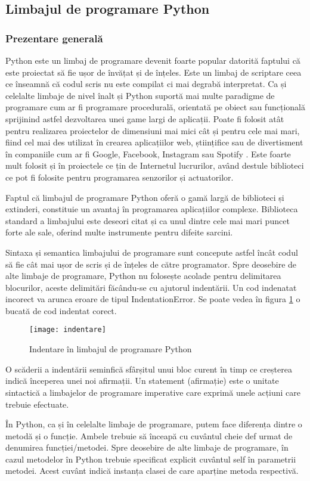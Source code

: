 \documentclass[../IoMusT.tex]{subfiles}
\begin{document}
\subsection{Limbajul de programare Python}
\subsubsection{Prezentare generală}
Python este un limbaj de programare devenit foarte popular datorită faptului că este proiectat să fie ușor de învățat și de înțeles. Este un limbaj de scriptare ceea ce înseamnă că codul scris nu este compilat ci mai degrabă interpretat. Ca și celelalte limbaje de nivel înalt și Python suportă mai multe paradigme de programare cum ar fi programare procedurală, orientată pe obiect sau funcțională sprijinind astfel dezvoltarea unei game largi de aplicații. Poate fi folosit atât pentru realizarea proiectelor de dimensiuni mai mici cât și pentru cele mai mari, fiind cel mai des utilizat în crearea aplicațiilor web, științifice sau de divertisment în companiile cum ar fi Google, Facebook, Instagram sau Spotify \cite{pythonWhere}. Este foarte mult folosit și în proiectele ce țin de Internetul lucrurilor, având destule biblioteci ce pot fi folosite pentru programarea senzorilor și actuatorilor.
\\
\par Faptul că limbajul de programare Python oferă o gamă largă de biblioteci și extinderi, constituie un avantaj în programarea aplicațiilor complexe. Biblioteca standard a limbajului este deseori citat și ca unul dintre cele mai mari puncet forte ale sale, oferind multe instrumente pentru difeite sarcini.
\\
\par Sintaxa și semantica limbajului de programare sunt concepute astfel încât codul să fie cât mai ușor de scris și de înțeles de către programator. Spre deosebire de alte limbaje de programare, Python nu folosește acolade pentru delimitarea blocurilor, aceste delimitări făcându-se cu ajutorul indentării. Un cod indenatat incorect va arunca eroare de tipul IndentationError. Se poate vedea în figura \ref{fig:indent} o bucată de cod indentat corect.
\begin{figure}[h]
\centering
\texttt{[image: indentare]}
\caption{Indentare în limbajul de programare Python}
\label{fig:indent}
\end{figure}
O scăderii  a indentării  seminfică sfârșitul unui bloc curent în timp ce creșterea indică începerea unei noi afirmații. Un statement (afirmație) este o unitate sintactică a limbajelor de programare imperative care exprimă  unele acțiuni care trebuie efectuate.
\\
\par În Python, ca și în celelalte limbaje de programare, putem face diferența dintre o metodă și o funcție. Ambele trebuie să înceapă cu cuvântul cheie def urmat de denumirea funcției/metodei. Spre deosebire de alte limbaje de prog\-ra\-ma\-re, în cazul metodelor în Python trebuie specificat explicit cuvântul self în parametrii metodei. Acest cuvânt indică instanța clasei de care aparține metoda respectivă.
\end{document}
